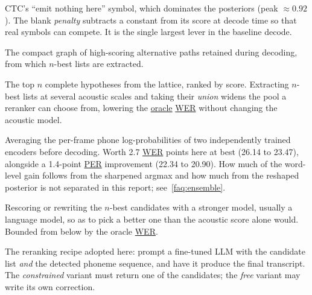 \documentclass{article}
\DeclareRobustCommand{\glref}[2]{\hyperlink{gl:#1}{\textcolor{glosslink}{#2}}}
\newcommand{\glentry}[2]{\item[\hypertarget{gl:#1}{#2}]}
\newenvironment{glosslist}
  {\begin{description}[style=nextline,leftmargin=2.1em,labelindent=0pt,
      itemsep=5pt,parsep=0pt,topsep=2pt,font=\normalfont\bfseries]}
  {\end{description}}
\DeclareRobustCommand{\wer}{\glref{wer}{WER}}
\DeclareRobustCommand{\per}{\glref{per}{PER}}
\begin{document}
\begin{glosslist}
\glentry{blank}{Blank symbol, and blank penalty}
CTC's ``emit nothing here'' symbol, which dominates the posteriors (peak $\approx 0.92$). The blank
\emph{penalty} subtracts a constant from its score at decode time so that real symbols can compete. It is
the single largest lever in the baseline decode.

\glentry{lattice}{Lattice}
The compact graph of high-scoring alternative paths retained during decoding, from which $n$-best lists
are extracted.

\glentry{nbest}{$n$-best list}
The top $n$ complete hypotheses from the lattice, ranked by score. Extracting $n$-best lists at several
acoustic scales and taking their \emph{union} widens the pool a reranker can choose from, lowering the
\glref{oracle}{oracle} \wer{} without changing the acoustic model.

\glentry{ensemble}{Ensemble}
Averaging the per-frame phone log-probabilities of two independently trained encoders before decoding.
Worth 2.7 \wer{} points here at best (26.14 to 23.47), alongside a 1.4-point \per{} improvement (22.34 to
20.90). How much of the word-level gain follows from the sharpened argmax and how much from the reshaped
posterior is not separated in this report; see~\ref{faq:ensemble}.

\glentry{rerank}{Reranking}
Rescoring or rewriting the $n$-best candidates with a stronger model, usually a language model, so as to
pick a better one than the acoustic score alone would. Bounded from below by the oracle \wer{}.

\glentry{lift}{LIFT \textnormal{(DCoND-LIFT style)}}
The reranking recipe adopted here: prompt a fine-tuned LLM with the candidate list \emph{and} the detected
phoneme sequence, and have it produce the final transcript. The \emph{constrained} variant must return one
of the candidates; the \emph{free} variant may write its own correction.

\end{glosslist}
\end{document}
